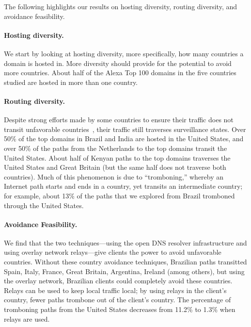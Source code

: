 The following highlights our results on hosting diversity, routing diversity, and avoidance feasibility.

\paragraph{Hosting diversity.} We start by looking at hosting diversity, more specifically, how many
countries a domain is hosted in.  More diversity should provide for the
potential to avoid more countries.  About half of the
Alexa Top 100 domains in the five countries studied are hosted in more
than one country. 

\paragraph{Routing diversity.} Despite strong efforts made by some countries to ensure their traffic does 
not transit unfavorable countries~\cite{brazil_history, brazil_break_from_US, brazil_conference,
  brazil_conference2, brazil_human_rights},
their traffic still traverses surveillance states.  Over 50\% of the top domains in
Brazil and India are hosted in the United States, and over 50\% of the
paths from the Netherlands to the top domains transit the
United States.  About half of Kenyan paths to the top domains traverses the United States
and Great Britain (but the same half does not traverse both countries).  Much of this phenomenon is
due to ``tromboning,'' whereby an Internet path starts and ends in a
country, yet transits an intermediate country; for example, about 13\%
of the paths that we explored from Brazil tromboned through the United States. 

\paragraph{Avoidance Feasibility.} We find that the two techniques---using the open DNS resolver 
infrastructure and using overlay network relays---give clients the power to avoid unfavorable countries.  Without these
country avoidance techniques, Brazilian paths transitted Spain, Italy,
France, Great Britain, Argentina, Ireland (among others), but using the
overlay network, Brazilian clients could completely avoid these
countries.  Relays can be used to
keep local traffic local; by using relays in the client's country, fewer
paths trombone out of the client's country.  The percentage of tromboning paths
from the United States decreases from 11.2\% to 1.3\% when
relays are used.   

